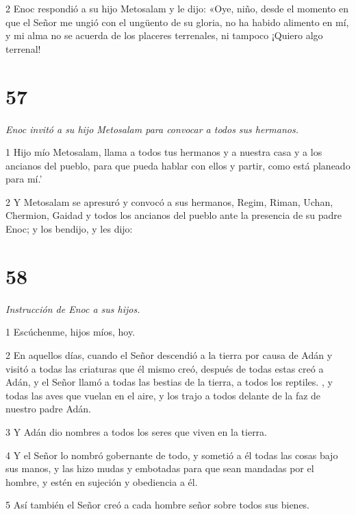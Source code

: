\par 2 Enoc respondió a su hijo Metosalam y le dijo: «Oye, niño, desde el momento en que el Señor me ungió con el ungüento de su gloria, no ha habido alimento en mí, y mi alma no se acuerda de los placeres terrenales, ni tampoco ¡Quiero algo terrenal!

\chapter{57}

\par \textit{Enoc invitó a su hijo Metosalam para convocar a todos sus hermanos.}

\par 1 Hijo mío Metosalam, llama a todos tus hermanos y a nuestra casa y a los ancianos del pueblo, para que pueda hablar con ellos y partir, como está planeado para mí.'

\par 2 Y Metosalam se apresuró y convocó a sus hermanos, Regim, Riman, Uchan, Chermion, Gaidad y todos los ancianos del pueblo ante la presencia de su padre Enoc; y los bendijo, y les dijo:

\chapter{58}

\par \textit{Instrucción de Enoc a sus hijos.}

\par 1 Escúchenme, hijos míos, hoy.

\par 2 En aquellos días, cuando el Señor descendió a la tierra por causa de Adán y visitó a todas las criaturas que él mismo creó, después de todas estas creó a Adán, y el Señor llamó a todas las bestias de la tierra, a todos los reptiles. , y todas las aves que vuelan en el aire, y los trajo a todos delante de la faz de nuestro padre Adán.

\par 3 Y Adán dio nombres a todos los seres que viven en la tierra.

\par 4 Y el Señor lo nombró gobernante de todo, y sometió a él todas las cosas bajo sus manos, y las hizo mudas y embotadas para que sean mandadas por el hombre, y estén en sujeción y obediencia a él.

\par 5 Así también el Señor creó a cada hombre señor sobre todos sus bienes.


